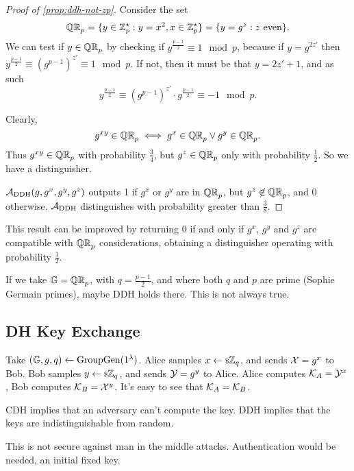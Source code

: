 \begin{proof}[Proof of \cref{prop:ddh-not-zp}]
	Consider the set
	\begin{equation*}
		\mathbb{QR}_p = \{ y \in \mathbb{Z}_p^{\star} : y = x^2, x \in \mathbb{Z}_p^{\star} \} = \{ y = g^z : z \text{ even} \}.
	\end{equation*}
	We can test if $y \in \mathbb{QR}_p$ by checking if $y^{\frac{p-1}{2}} \equiv 1 \mod p$, because if $y = g^{2z'}$ then $y^{\frac{p-1}{2}} \equiv \left( g^{p-1} \right)^{z'} \equiv 1 \mod p$.
	If not, then it must be that $y = 2 z' + 1$, and as such
	\begin{equation*}
		y^{\frac{p-1}{2}} \equiv \left( g^{p-1} \right)^{z'} \cdot g^{\frac{p-1}{2}} \equiv -1 \mod p.
	\end{equation*}

	Clearly,
	\begin{equation*}
		g^{xy} \in \mathbb{QR}_p \iff g^{x} \in \mathbb{QR}_p \lor g^y \in \mathbb{QR}_p.
	\end{equation*}
	Thus $g^{xy} \in \mathbb{QR}_p$ with probability $\frac{3}{4}$, but $g^z \in \mathbb{QR}_p$ only with probability $\frac{1}{2}$.
	So we have a distinguisher.

	$\mathcal{A}_{\text{DDH}}(g, g^x, g^y, g^z)$ outputs 1 if $g^x$ or $g^y$ are in $\mathbb{QR}_p$, but $g^z \not\in \mathbb{QR}_p$, and $0$ otherwise.
	$\mathcal{A}_{\text{DDH}}$ distinguishes with probability greater than $\frac{3}{8}$.
\end{proof}
This result can be improved by returning 0 if and only if $g^x$, $g^y$ and $g^z$ are compatible with $\mathbb{QR}_p$ considerations, obtaining a distinguisher operating with probability $\frac{1}{2}$.

If we take $\mathbb{G} = \mathbb{QR}_p$, with $q = \frac{p-1}{2}$, and where both $q$ and $p$ are prime (Sophie Germain primes), maybe \ac{DDH} holds there.
This is not always true.

\subsection{\acl{DH} Key Exchange}

Take $(\mathbb{G} , \allowbreak g , \allowbreak q) \leftarrow \mathrm{GroupGen}(1^{\lambda})$.
Alice samples $x \leftarrow {\scriptstyle \$} {\mathbb{Z}_q}$, and sends $\mathcal{X} = g^x$ to Bob.
Bob samples $y \leftarrow {\scriptstyle \$} {\mathbb{Z}_q}$, and sends $\mathcal{Y} = g^y$ to Alice.
Alice computes $\mathcal{K}_A = \mathcal{Y}^x$, Bob computes $\mathcal{K}_B = \mathcal{X}^y$.
It's easy to see that $\mathcal{K}_A = \mathcal{K}_B$.

\ac{CDH} implies that an adversary can't compute the key.
\ac{DDH} implies that the keys are indistinguishable from random.

This is not secure against man in the middle attacks.
Authentication would be needed, an initial fixed key.

